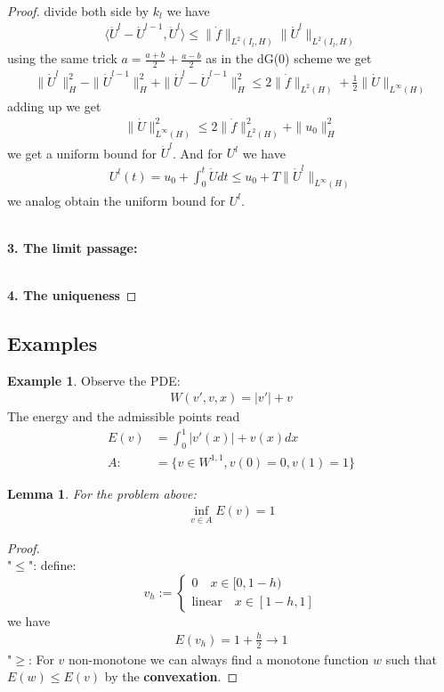 \documentclass[a4paper,12pt,oneside,fleqn]{book}
\newtheorem{lemma}[theorem]{Lemma}
\theoremstyle{definition}
\newtheorem*{example}{Example}
\theoremstyle{remark}
\begin{document}
\begin{proof}
	divide both side by $k_l$ we have
	\begin{align*}
		\langle \dot{U}^l - \dot{U}^{l -1}, \dot{U}^l \rangle \le \|\dot{f}\|_{L^2(I_l, H)} \|\dot{U}^l\|_{L^2(I_l, H)} 
	\end{align*}
	using the same trick $a = \frac{a + b}{2} + \frac{a -b}{2}$ as in the dG(0) scheme we get
	\begin{align*}
		\|\dot{U}^l\|_H^2 - \|\dot{U}^{l -1}\|_H^2 + \|\dot{U}^l - \dot{U}^{l -1}\|_H^2 \le 2 \|\dot{f}\|_{L^2(H)}  + \frac{1}{2} \|\dot{U}\|_{L^\infty(H)}
	\end{align*}
	adding up we get
	\begin{align*}
		\|\dot{U}\|_{L^\infty(H)}^2 \le 2 \|\dot{f}\|_{L^2(H)}^2 + \|u_0\|_H^2
	\end{align*}
	we get a uniform bound for $\dot{U}^l$. And for $U^l$ we have
	\begin{align*}
		U^l(t) = u_0 + \int_0^t \dot{U} dt \le u_0 + T \|\dot{U}^l\|_{L^\infty(H)}
	\end{align*}
	we analog obtain the uniform bound for $U^l$. 
	
	
	\quad\\
	\textbf{3. The limit passage:}
	
	\quad\\
	\textbf{4. The uniqueness}
\end{proof}



\subsection{Examples}          
\begin{example}
Observe the PDE:
\begin{align*}
	W(v', v, x) = |v'| + v 
\end{align*}
The energy and the admissible points read
\begin{align*}
	E(v)&= \int_0^1 |v'(x)| + v(x) dx\\
	A:&= \{ v \in W^{1, 1}, v(0) = 0, v(1) = 1\}
\end{align*}
\end{example}

\begin{lemma}
	For the problem above:
	\begin{align*}
		\inf_{ v \in A} E(v) = 1
	\end{align*}
\end{lemma}
\begin{proof}\quad\\
"$\le$": define:
\begin{equation*}
	v_h:= \left\{
	\begin{aligned}
		0 \quad x \in [0, 1-h)\\
		\text{linear} \quad x \in [1-h, 1]
	\end{aligned}
	\right.
\end{equation*}
we have
\begin{align*}
	E(v_h) = 1 + \frac{h}{2} \rightarrow 1
\end{align*}
"$\ge$: For $v$ non-monotone we can always find a monotone function $w$ such that $E(w) \le E(v)$ by the \textbf{convexation}.
\end{proof}
\end{document}
